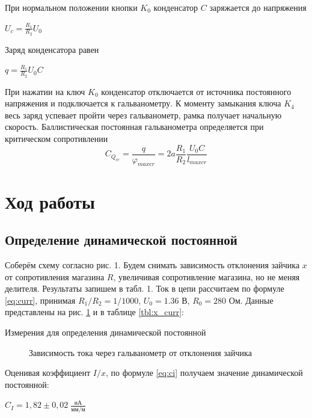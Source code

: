 \documentclass[a4paper,12pt]{article}
\begin{document}
    При нормальном положении кнопки $K_0$ конденсатор $C$ заряжается до напряжения
    \begin{center}
        $U_c = \frac{R_1}{R_2}U_0$
    \end{center}
    Заряд конденсатора равен
    \begin{center}
        $q = \frac{R_1}{R_2}U_0 C$
    \end{center}
    При нажатии на ключ $K_0$ конденсатор отключается от источника постоянного напряжения и подключается к гальванометру. К моменту замыкания ключа $K_4$ весь заряд успевает пройти через гальванометр, рамка получает начальную скорость. Баллистическая постоянная гальванометра определяется при критическом сопротивлении
    \begin{equation}
        C_{Q_{cr}} = \frac{q}{\varphi_{max cr}} = 2a\frac{R_1}{R_2} \frac{U_0 C}{l_{max cr}}
    \end{equation}

\section{Ход работы}
\subsection{Определение динамической постоянной}

  Соберём схему согласно рис. 1. Будем снимать зависимость отклонения зайчика $x$ от сопротивления магазина $R$, увеличивая сопротивление магазина, но не меняя делителя. Результаты запишем в табл. 1. Ток в цепи рассчитаем по формуле \eqref{eq:curr}, принимая $R_1/R_2 = 1/1000$, $U_0 = 1.36$ В, $R_0 = 280$ Ом. Данные представлены на рис. \ref{fig:x_curr} и в таблице \ref{tbl:x_curr}:
  \begin{table}[h]
    \centering
    
    \caption{Измерения для определения динамической постоянной}
    \label{tbl:x_curr}
  \end{table}


  \begin{figure}[!h]
    \centering
    
    \caption{Зависимость тока через гальванометр от отклонения зайчика}
    \label{fig:x_curr}
  \end{figure}

  Оценивая коэффициент $I/x$, по формуле \eqref{eq:ci} получаем значение динамической постоянной:
  \begin{center}
  $\boxed{C_I = 1,82 \pm 0,02 \; \frac{\text{нА}}{\text{мм/м}}}$
  \end{center}
\end{document}
